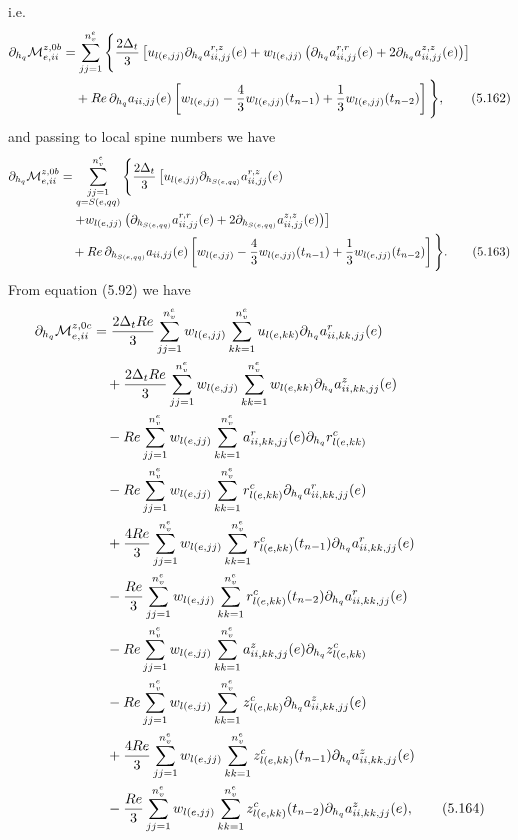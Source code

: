\documentclass{article}
\begin{document}
i.e.
\begin{align}
\partial_{h_q}\mathcal{M}_{e,ii}^{z,0b} &= \sum_{jj=1}^{n_v^e} \Bigg\{ \frac{2\Delta_t}{3} \left[ u_{l(e,jj)} \partial_{h_q} a_{ii,jj}^{r,z}(e) + w_{l(e,jj)} \left( \partial_{h_q} a_{ii,jj}^{r,r}(e) + 2 \partial_{h_q} a_{ii,jj}^{z,z}(e) \right) \right] \nonumber\\
&\quad + Re\, \partial_{h_q} a_{ii,jj}(e) \left[ w_{l(e,jj)} - \frac{4}{3} w_{l(e,jj)}(t_{n-1}) + \frac{1}{3} w_{l(e,jj)}(t_{n-2}) \right] \Bigg\}, \tag{5.162}
\end{align}
and passing to local spine numbers we have
\begin{align}
\partial_{h_q}\mathcal{M}_{e,ii}^{z,0b} &= \sum_{\substack{jj=1\\ q=S(e,qq)}}^{n_v^e} \Bigg\{ \frac{2\Delta_t}{3} \left[ u_{l(e,jj)} \partial_{h_{S(e,qq)}} a_{ii,jj}^{r,z}(e) \right. \nonumber\\
&\quad \left. + w_{l(e,jj)} \left( \partial_{h_{S(e,qq)}} a_{ii,jj}^{r,r}(e) + 2 \partial_{h_{S(e,qq)}} a_{ii,jj}^{z,z}(e) \right) \right] \nonumber\\
&\quad + Re\, \partial_{h_{S(e,qq)}} a_{ii,jj}(e) \left[ w_{l(e,jj)} - \frac{4}{3} w_{l(e,jj)}(t_{n-1}) + \frac{1}{3} w_{l(e,jj)}(t_{n-2}) \right] \Bigg\}. \tag{5.163}
\end{align}
From equation (5.92) we have
\begin{align}
\partial_{h_q}\mathcal{M}_{e,ii}^{z,0c} &= \frac{2\Delta_t Re}{3} \sum_{jj=1}^{n_v^e} w_{l(e,jj)} \sum_{kk=1}^{n_v^e} u_{l(e,kk)} \partial_{h_q} a_{ii,kk,jj}^r(e) \nonumber\\
&\quad + \frac{2\Delta_t Re}{3} \sum_{jj=1}^{n_v^e} w_{l(e,jj)} \sum_{kk=1}^{n_v^e} w_{l(e,kk)} \partial_{h_q} a_{ii,kk,jj}^z(e) \nonumber\\
&\quad - Re \sum_{jj=1}^{n_v^e} w_{l(e,jj)} \sum_{kk=1}^{n_v^e} a_{ii,kk,jj}^r(e) \partial_{h_q} r_{l(e,kk)}^c \nonumber\\
&\quad - Re \sum_{jj=1}^{n_v^e} w_{l(e,jj)} \sum_{kk=1}^{n_v^e} r_{l(e,kk)}^c \partial_{h_q} a_{ii,kk,jj}^r(e) \nonumber\\
&\quad + \frac{4Re}{3} \sum_{jj=1}^{n_v^e} w_{l(e,jj)} \sum_{kk=1}^{n_v^e} r_{l(e,kk)}^c(t_{n-1}) \partial_{h_q} a_{ii,kk,jj}^r(e) \nonumber\\
&\quad - \frac{Re}{3} \sum_{jj=1}^{n_v^e} w_{l(e,jj)} \sum_{kk=1}^{n_v^e} r_{l(e,kk)}^c(t_{n-2}) \partial_{h_q} a_{ii,kk,jj}^r(e) \nonumber\\
&\quad - Re \sum_{jj=1}^{n_v^e} w_{l(e,jj)} \sum_{kk=1}^{n_v^e} a_{ii,kk,jj}^z(e) \partial_{h_q} z_{l(e,kk)}^c \nonumber\\
&\quad - Re \sum_{jj=1}^{n_v^e} w_{l(e,jj)} \sum_{kk=1}^{n_v^e} z_{l(e,kk)}^c \partial_{h_q} a_{ii,kk,jj}^z(e) \nonumber\\
&\quad + \frac{4Re}{3} \sum_{jj=1}^{n_v^e} w_{l(e,jj)} \sum_{kk=1}^{n_v^e} z_{l(e,kk)}^c(t_{n-1}) \partial_{h_q} a_{ii,kk,jj}^z(e) \nonumber\\
&\quad - \frac{Re}{3} \sum_{jj=1}^{n_v^e} w_{l(e,jj)} \sum_{kk=1}^{n_v^e} z_{l(e,kk)}^c(t_{n-2}) \partial_{h_q} a_{ii,kk,jj}^z(e), \tag{5.164}
\end{align}
\end{document}
